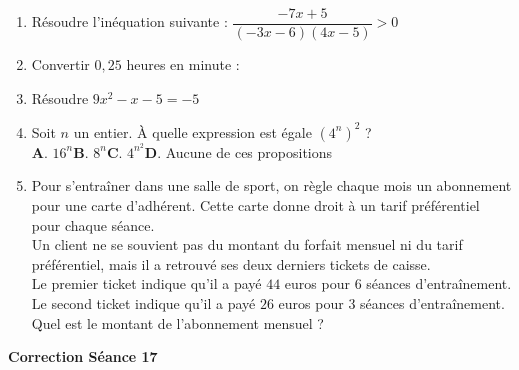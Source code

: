 \documentclass[a4paper,11pt]{article}
\begin{document}
\begin{seanceD}{} %

\begin{enumerate}
\item Résoudre l'inéquation suivante : $\dfrac{-7x+5}{(-3x-6)(4x-5)} > 0$ \dotfill

\dotfill

\dotfill



\item Convertir $0{,}25$ heures en minute : \dotfill



\item Résoudre $9x^2-x-5=-5$ \dotfill

\dotfill



\item Soit $n$ un entier. À quelle expression est égale $\left(4^n\right)^{2}$ ? \\

\textbf{A}. $16^{n}$\qquad \textbf{B}. $8^{n}$\qquad \textbf{C}. $4^{n^{2}}$\qquad \textbf{D}. Aucune de ces propositions\qquad 



\item Pour s'entraîner dans une salle de sport, on règle chaque mois un abonnement pour une carte d'adhérent. Cette carte donne droit à un tarif préférentiel pour chaque séance.\\
    Un client ne se souvient pas du montant du forfait mensuel ni du tarif préférentiel, mais il a retrouvé ses deux derniers tickets de caisse.\\
    Le premier ticket indique qu'il a payé $44$ euros pour $6$ séances d'entraînement.\\
    Le second ticket indique qu'il a payé $26$ euros pour $3$ séances d'entraînement.\\
    Quel est le montant de l'abonnement mensuel ? \dotfill

\end{enumerate}

\end{seanceD}

\vspace{0.5cm}
\begin{center}

\textbf{\textcolor{Couleur8}{Correction Séance 17}}\\
\vspace{2mm}

\end{center}
\end{document}
